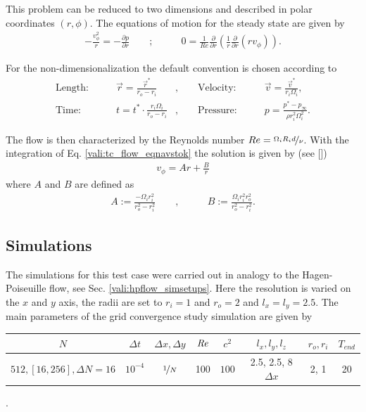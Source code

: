This problem can be reduced to two dimensions and described in polar coordinates $(r, \phi)$. The equations of motion for the steady state are given by \citep{Kundu2012}
\begin{align}
    \label{vali:tc_flow_eqnavstok}
    -\frac{v^2_\phi}{r} = - \frac{\partial p}{\partial r} \qquad ;& \qquad 0 = \frac{1}{Re}\frac{\partial}{\partial r}\left(\frac{1}{r}\frac{\partial}{\partial r}(r v_\phi)\right).
\end{align}

\clearpage

For the non-dimensionalization the default convention is chosen according to  \citep{Chen2015}
\begin{align}
    \text{Length:}\qquad &  \vec{r} = \frac{\vec{r}^*}{r_o - r_i}  &,
    \qquad \text{Velocity:}\qquad& \vec{v} =  \frac{\vec{v}^*}{r_i\Omega_i},\\
    \text{Time:}  \qquad & t = t^* \cdot \frac{r_i \Omega_i}{r_o - r_i}&,
    \qquad  \text{Pressure:}\qquad & p = \frac{p^* - p_\infty}{\rho r_i^2\Omega_i^2}.
\end{align}


The flow is then characterized by the Reynolds number $Re = \nicefrac{\Omega_i R_i d}{\nu}$.
With the integration of Eq. \ref{vali:tc_flow_eqnavstok} the solution is given by (see [\citep{Kundu2012}])
\begin{align}
    v_\phi = Ar + \frac{B}{r}
\end{align}
where $A$ and $B$ are defined as
\begin{align}
    A := \frac{-\Omega_i r_i^2}{r^2_o - r^2_i} \qquad ,& \qquad B := \frac{\Omega_i r^2_i r^2_o}{r^2_o - r^2_i}.
\end{align}

\subsection{Simulations}


The simulations for this test case were carried out in analogy to the Hagen-Poiseuille flow, see Sec. \ref{vali:hpflow_simsetups}.
Here the resolution is varied on the $x$ and $y$ axis, the radii are set to $r_i=1$ and $r_o=2$ and $l_x=l_y=2.5$.
The main parameters of the grid convergence study simulation are  given by

\begin{center}
\vspace*{0.7ex}
\begin{tabular}{c|c|c|c|c|c|c|c }
 $ N  $                   & $\Delta t$ & $\Delta x, \Delta y$            & $\mbox{\textit{Re}}$  & $c^2$   & $l_x, l_y, l_z$ & $r_o, r_i$ & $T_{end}$\\
\hline
 $512, [16, 256], \Delta N = 16 $& $10^{-4}$ & $\nicefrac{1}{N}$ & 100     & $100$   & 2.5, 2.5, 8$\Delta x$ & 2, 1    & 20\\
\end{tabular}.
\vspace*{0.7ex}
\end{center}

